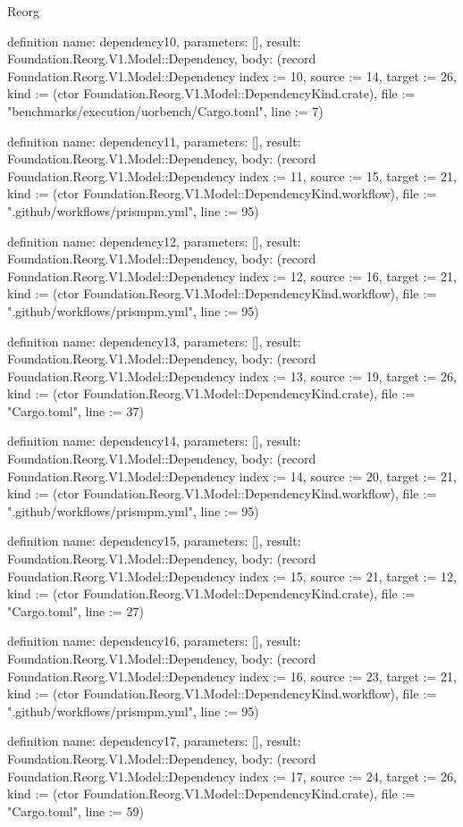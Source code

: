 \begin{lexlean}{Reorg}
\begin{semanticmodule}
definition{
  name: dependency10,
  parameters: [],
  result: Foundation.Reorg.V1.Model::Dependency,
  body: (record Foundation.Reorg.V1.Model::Dependency {index := 10, source := 14, target := 26, kind := (ctor Foundation.Reorg.V1.Model::DependencyKind.crate), file := "benchmarks/execution/uorbench/Cargo.toml", line := 7})
}

definition{
  name: dependency11,
  parameters: [],
  result: Foundation.Reorg.V1.Model::Dependency,
  body: (record Foundation.Reorg.V1.Model::Dependency {index := 11, source := 15, target := 21, kind := (ctor Foundation.Reorg.V1.Model::DependencyKind.workflow), file := ".github/workflows/prismpm.yml", line := 95})
}

definition{
  name: dependency12,
  parameters: [],
  result: Foundation.Reorg.V1.Model::Dependency,
  body: (record Foundation.Reorg.V1.Model::Dependency {index := 12, source := 16, target := 21, kind := (ctor Foundation.Reorg.V1.Model::DependencyKind.workflow), file := ".github/workflows/prismpm.yml", line := 95})
}

definition{
  name: dependency13,
  parameters: [],
  result: Foundation.Reorg.V1.Model::Dependency,
  body: (record Foundation.Reorg.V1.Model::Dependency {index := 13, source := 19, target := 26, kind := (ctor Foundation.Reorg.V1.Model::DependencyKind.crate), file := "Cargo.toml", line := 37})
}

definition{
  name: dependency14,
  parameters: [],
  result: Foundation.Reorg.V1.Model::Dependency,
  body: (record Foundation.Reorg.V1.Model::Dependency {index := 14, source := 20, target := 21, kind := (ctor Foundation.Reorg.V1.Model::DependencyKind.workflow), file := ".github/workflows/prismpm.yml", line := 95})
}

definition{
  name: dependency15,
  parameters: [],
  result: Foundation.Reorg.V1.Model::Dependency,
  body: (record Foundation.Reorg.V1.Model::Dependency {index := 15, source := 21, target := 12, kind := (ctor Foundation.Reorg.V1.Model::DependencyKind.crate), file := "Cargo.toml", line := 27})
}

definition{
  name: dependency16,
  parameters: [],
  result: Foundation.Reorg.V1.Model::Dependency,
  body: (record Foundation.Reorg.V1.Model::Dependency {index := 16, source := 23, target := 21, kind := (ctor Foundation.Reorg.V1.Model::DependencyKind.workflow), file := ".github/workflows/prismpm.yml", line := 95})
}

definition{
  name: dependency17,
  parameters: [],
  result: Foundation.Reorg.V1.Model::Dependency,
  body: (record Foundation.Reorg.V1.Model::Dependency {index := 17, source := 24, target := 26, kind := (ctor Foundation.Reorg.V1.Model::DependencyKind.crate), file := "Cargo.toml", line := 59})
}


\end{semanticmodule}
\end{lexlean}
